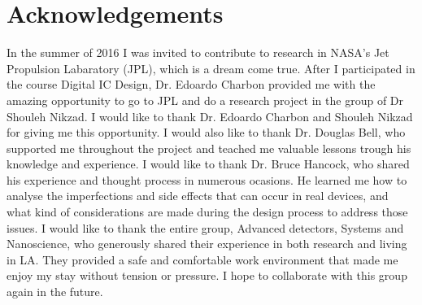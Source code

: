 \section{Acknowledgements}\label{sec:acknowledgements}
In the summer of 2016 I was invited to contribute to research in NASA's Jet Propulsion Labaratory (JPL), which is a dream come true. After I participated in the course Digital IC Design, Dr. Edoardo Charbon provided me with the amazing opportunity to go to JPL and do a research project in the group of Dr Shouleh Nikzad. I would like to thank Dr. Edoardo Charbon and Shouleh Nikzad for giving me this opportunity. I would also like to thank Dr. Douglas Bell, who supported me throughout the project and teached me valuable lessons trough his knowledge and experience. I would like to thank Dr. Bruce Hancock, who shared his experience and thought process in numerous ocasions. He learned me how to analyse the imperfections and side effects that can occur in real devices, and what kind of considerations are made during the design process to address those issues. I would like to thank the entire group, Advanced detectors, Systems and Nanoscience, who generously shared their experience in both research and living in LA. They provided a safe and comfortable work environment that made me enjoy my stay without tension or pressure. I hope to collaborate with this group again in the future.
